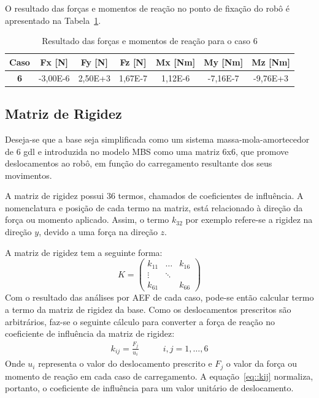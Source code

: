 O resultado das forças e momentos de reação no ponto de fixação do robô é
apresentado na Tabela~\ref{tab::res_FEA_forcas}. 

\begin{table}[h!]
\centering
\caption{Resultado das forças e momentos de reação para o caso 6}
\label{tab::res_FEA_forcas}
\begin{tabular}{@{}ccccccc@{}}
\toprule
\textbf{Caso} & \textbf{Fx [N]} & \textbf{Fy [N]} & \textbf{Fz [N]} &
\textbf{Mx [Nm]} & \textbf{My [Nm]} & \textbf{Mz [Nm]} \\ \midrule \textbf{6}   
& -3,00E-6 & 2,50E+3    & 1,67E-7    & 1,12E-6    & -7,16E-7   & -9,76E+3   \\ \bottomrule
\end{tabular}
\end{table}


\subsection{Matriz de Rigidez}

Deseja-se que a base seja simplificada como um sistema massa-mola-amortecedor de
6 gdl e introduzida no modelo MBS como uma matriz 6x6, que promove deslocamentos
ao robô, em função do carregamento resultante dos seus movimentos.

A matriz de rigidez possui 36 termos, chamados de coeficientes de influência.
A nomenclatura e posição de cada termo na matriz, está relacionado à direção da
força ou momento aplicado. Assim, o termo $k_{32}$ por exemplo refere-se a
rigidez na direção $y$, devido a uma força na direção $z$.

A matriz de rigidez tem a seguinte forma:
\begin{equation}
K = \begin{pmatrix} 
    k_{11} & \dots 	& k_{16} \\
    \vdots & \ddots & \\
    k_{61} &        & k_{66} 
    \end{pmatrix}
\end{equation}
%
Com o resultado das análises por AEF de cada caso, pode-se então calcular termo
a termo da matriz de rigidez da base. Como os deslocamentos prescritos são
arbitrários, faz-se o seguinte cálculo para converter a força de reação no
coeficiente de influência da matriz de rigidez:
%
\begin{align} \label{eq::kij}
	k_{ij} = \frac{F_j}{u_{i}} \qquad &  i,j = 1,\ldots,6
\end{align}
%
Onde $u_i$ representa o valor do deslocamento prescrito e $F_j$ o valor da força
ou momento de reação em cada caso de carregamento. A equação~\ref{eq::kij}
normaliza, portanto, o coeficiente de influência para um valor unitário de
deslocamento.

